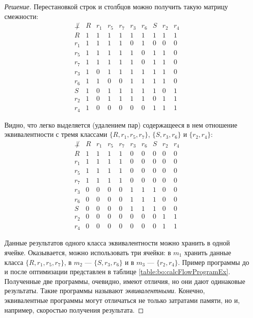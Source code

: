 \begin{proof}[Решение]
    Перестановкой строк и столбцов можно получить такую матрицу смежности:
    \[
        \begin{array}{c|ccccccccc}
            \not\perp
                & R &r_1&r_5&r_7&r_3&r_6& S &r_2&r_4\\\hline
            R   & 1 & 1 & 1 & 1 & 1 & 1 & 1 & 1 & 1\\
            r_1 & 1 & 1 & 1 & 1 & 0 & 1 & 0 & 0 & 0\\
            r_5 & 1 & 1 & 1 & 1 & 1 & 0 & 1 & 1 & 0\\
            r_7 & 1 & 1 & 1 & 1 & 1 & 0 & 1 & 1 & 0\\
            r_3 & 1 & 0 & 1 & 1 & 1 & 1 & 1 & 1 & 0\\
            r_6 & 1 & 1 & 0 & 0 & 1 & 1 & 1 & 1 & 0\\
            S   & 1 & 0 & 1 & 1 & 1 & 1 & 1 & 0 & 1\\
            r_2 & 1 & 0 & 1 & 1 & 1 & 1 & 0 & 1 & 1\\
            r_4 & 1 & 0 & 0 & 0 & 0 & 0 & 1 & 1 & 1
        \end{array}
    \]
    
    Видно, что легко выделяется (удалением пар) содержащееся в нем отношение эквивалентности с тремя классами $\{R,r_1,r_5,r_7\}$, $\{S,r_3,r_6\}$ и $\{r_2,r_4\}$:
    \[
        \begin{array}{c|ccccccccc}
            \not\perp
                & R &r_1&r_5&r_7&r_3&r_6& S &r_2&r_4\\\hline
            R   & 1 & 1 & 1 & 1 & 0 & 0 & 0 & 0 & 0\\
            r_1 & 1 & 1 & 1 & 1 & 0 & 0 & 0 & 0 & 0\\
            r_5 & 1 & 1 & 1 & 1 & 0 & 0 & 0 & 0 & 0\\
            r_7 & 1 & 1 & 1 & 1 & 0 & 0 & 0 & 0 & 0\\
            r_3 & 0 & 0 & 0 & 0 & 1 & 1 & 1 & 0 & 0\\
            r_6 & 0 & 0 & 0 & 0 & 1 & 1 & 1 & 0 & 0\\
            S   & 0 & 0 & 0 & 0 & 1 & 1 & 1 & 0 & 0\\
            r_2 & 0 & 0 & 0 & 0 & 0 & 0 & 0 & 1 & 1\\
            r_4 & 0 & 0 & 0 & 0 & 0 & 0 & 0 & 1 & 1
        \end{array}
    \]
    
    Данные результатов одного класса эквивалентности можно хранить в одной ячейке. Оказывается, можно использовать три ячейки: в $m_1$ хранить данные класса $\{R,r_1,r_5,r_7\}$, в $m_2$ --- $\{S,r_3,r_6\}$ и в $m_3$ --- $\{r_2,r_4\}$. Пример программы до и после оптимизации представлен в таблице \ref{table:bo:calcFlowProgramEx}. Полученные две программы, очевидно, имеют отличия, но они дают одинаковые результаты. Такие программы называют \emph{эквивалентными}. Конечно, эквивалентные программы могут отличаться не только затратами памяти, но и, например, скоростью получения результата.
    

\end{proof}
